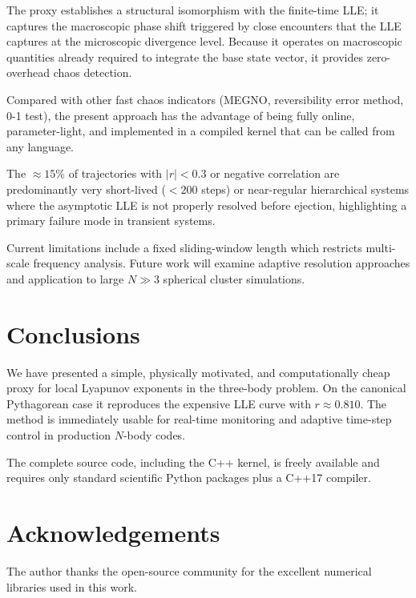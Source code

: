 \documentclass[useAMS,usenatbib,onecolumn]{mnras}
\begin{document}
The proxy establishes a structural isomorphism with the finite-time LLE; it captures the macroscopic phase shift triggered by close encounters that the LLE captures at the microscopic divergence level. Because it operates on macroscopic quantities already required to integrate the base state vector, it provides zero-overhead chaos detection.

Compared with other fast chaos indicators (MEGNO, reversibility error method, 0-1 test), the present approach has the advantage of being fully online, parameter-light, and implemented in a compiled kernel that can be called from any language.

The $\approx 15\%$ of trajectories with $|r| < 0.3$ or negative correlation are predominantly very short-lived ($< 200$ steps) or near-regular hierarchical systems where the asymptotic LLE is not properly resolved before ejection, highlighting a primary failure mode in transient systems.

Current limitations include a fixed sliding-window length which restricts multi-scale frequency analysis. Future work will examine adaptive resolution approaches and application to large $N \gg 3$ spherical cluster simulations.

\section{Conclusions}
\label{sec:conclusions}

We have presented a simple, physically motivated, and computationally cheap proxy for local Lyapunov exponents in the three-body problem. On the canonical Pythagorean case it reproduces the expensive LLE curve with $r \approx 0.810$. The method is immediately usable for real-time monitoring and adaptive time-step control in production $N$-body codes.

The complete source code, including the C++ kernel, is freely available and requires only standard scientific Python packages plus a C++17 compiler.

\section*{Acknowledgements}
The author thanks the open-source community for the excellent numerical libraries used in this work.



\end{document}

